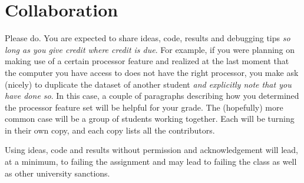 \documentclass{tufte-handout}
\begin{document}
\section{Collaboration}
Please do.  You are expected to share ideas, code, results and debugging tips 
\textit{so long as you give credit where credit is due}. For example, if you were
planning on making use of a certain processor feature and realized at the last 
moment that the computer you have access to does not have the right processor,
you make ask (nicely) to duplicate the dataset of another student \textit{and explicitly
note that you have done so}.  In this case, a couple of paragraphs describing
how you determined the processor feature set will be helpful for your grade.
The (hopefully) more common case will be a group of students working together.  
Each will be turning in their own copy, and each copy lists all the contributors.

Using ideas, code and results without permission and acknowledgement will lead,
at a minimum, to failing the assignment and may lead to failing the class as well as
other university sanctions.  
\end{document}
